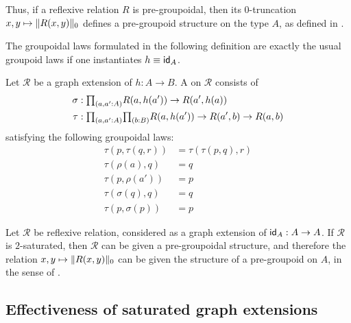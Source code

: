 Thus, if a reflexive relation $R$ is pre-groupoidal, then its $0$-truncation $x,y\mapsto\trunc{0}{R(x,y)}$ defines a pre-groupoid structure on the type $A$, as defined in \cite{AhrensKapulkinShulman}. 

The groupoidal laws formulated in the following definition are exactly the usual groupoid laws if one instantiates $h\jdeq \idfunc[A]$. 

\begin{defn}
Let $\mathcal{R}$ be a graph extension of $h:A\to B$. A  on $\mathcal{R}$ consists of
\begin{align*}
\sigma & : \prd{a,a':A} R(a,h(a'))\to R(a',h(a)) \\
\tau & : \prd{a,a':A}{b:B} R(a,h(a'))\to R(a',b)\to R(a,b)
\end{align*}
satisfying the following groupoidal laws:
\begin{align*}
\tau(p,\tau(q,r)) & =\tau(\tau(p,q),r) \tag{associativity}\\
\tau(\rho(a),q) & =q \tag{left unit law}\\
\tau(p,\rho(a')) & =p \tag{right unit law}\\
\tau(\sigma(q),q) & =q \tag{left inverse law}\\
\tau(p,\sigma(p)) & =p \tag{right inverse law}
\end{align*}
\end{defn}

\begin{prp}
Let $\mathcal{R}$ be reflexive relation, considered as a graph extension of $\idfunc[A]:A\to A$. If $\mathcal{R}$ is $2$-saturated, then $\mathcal{R}$ can be given a pre-groupoidal structure, and therefore the relation $x,y\mapsto \trunc{0}{R(x,y)}$ can be given the structure of a pre-groupoid on $A$, in the sense of \cite{AhrensKapulkinShulman}.
\end{prp}

\subsection{Effectiveness of saturated graph extensions}

